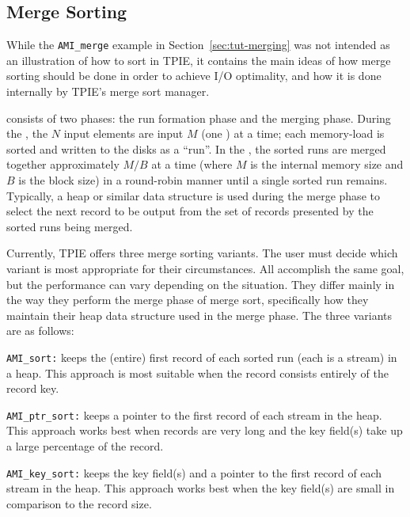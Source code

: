 \subsection{Merge Sorting} 
 While the \lstinline|AMI_merge| example in
Section~\ref{sec:tut-merging} was not intended as an illustration of
how to sort in TPIE, it contains the main ideas of how merge sorting
should be done in order to achieve I/O optimality, and how it is done
internally by TPIE's merge sort manager.

\noindent
{} consists of two phases: the run formation phase and
the merging phase.  During the , the $N$
input elements are input $M$ (one ) at a time; each
memory-load is sorted and written to the disks as a ``run''.  In the
, the sorted runs are merged together approximately
$M/B$ at a time (where $M$ is the internal memory size and $B$ is the
block size) in a round-robin manner until a single sorted run remains.
Typically, a heap or similar data structure is used during the merge
phase to select the next record to be output from the set of records
presented by the sorted runs being merged.

Currently, TPIE offers three merge sorting variants. The user must
decide which variant is most appropriate for their circumstances.  All
accomplish the same goal, but the performance can vary depending on
the situation. They differ mainly in the way they perform the merge
phase of merge sort, specifically how they maintain their heap data
structure used in the merge phase. The three variants are as follows:

\begin{description}
\item\lstinline|AMI_sort:| keeps the (entire) first record of each
  sorted run (each is a stream) in a heap. This approach is most
  suitable when the record consists entirely of the record key.
  
\item\lstinline|AMI_ptr_sort:| keeps a pointer to the first record of
  each stream in the heap. This approach works best when records are
  very long and the key field(s) take up a large percentage of the
  record.
  
\item\lstinline|AMI_key_sort:| keeps the key field(s) and a pointer to
  the first record of each stream in the heap. This approach works
  best when the key field(s) are small in comparison to the record
  size.
\end{description}

